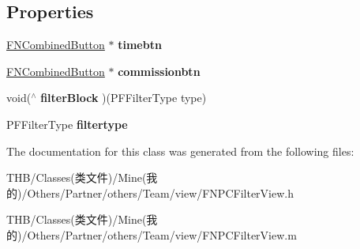 \subsection*{Properties}
\begin{DoxyCompactItemize}
\item 
\mbox{\label{interface_f_n_p_c_filter_view_afd2088846f89e5164f22a13d326b8c05}} 
\mbox{\hyperlink{interface_f_n_combined_button}{F\+N\+Combined\+Button}} $\ast$ {\bfseries timebtn}
\item 
\mbox{\label{interface_f_n_p_c_filter_view_a79ec8e64e462fd3fa3814583d4fb4364}} 
\mbox{\hyperlink{interface_f_n_combined_button}{F\+N\+Combined\+Button}} $\ast$ {\bfseries commissionbtn}
\item 
\mbox{\label{interface_f_n_p_c_filter_view_abf903c6262b270ef477957be0f6effbb}} 
void($^\wedge$ {\bfseries filter\+Block} )(P\+F\+Filter\+Type type)
\item 
\mbox{\label{interface_f_n_p_c_filter_view_a90ac285f415e1cc2e0e333d8d92e9757}} 
P\+F\+Filter\+Type {\bfseries filtertype}
\end{DoxyCompactItemize}


The documentation for this class was generated from the following files\+:\begin{DoxyCompactItemize}
\item 
T\+H\+B/\+Classes(类文件)/\+Mine(我的)/\+Others/\+Partner/others/\+Team/view/F\+N\+P\+C\+Filter\+View.\+h\item 
T\+H\+B/\+Classes(类文件)/\+Mine(我的)/\+Others/\+Partner/others/\+Team/view/F\+N\+P\+C\+Filter\+View.\+m\end{DoxyCompactItemize}
